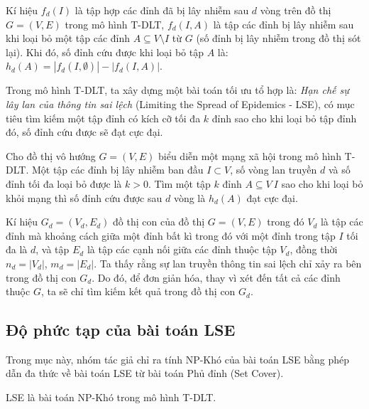 Kí hiệu $f_{d}(I)$ là tập hợp các đỉnh đã bị lây nhiễm sau $d$ vòng trên đồ thị $G = (V,E)$ trong mô hình T-DLT, $f_{d}(I,A)$ là tập các đỉnh bị lây nhiễm sau khi loại bỏ một tập các đỉnh $A \subseteq V \setminus I$ từ $G$ (số đỉnh bị lây nhiễm trong đồ thị sót lại). Khi đó, số đỉnh cứu được khi loại bỏ tập $A$ là: $h_{d}(A)=| f_{d}(I,\emptyset)|-|f_{d}(I,A)|$.

Trong mô hình T-DLT, ta xây dựng một bài toán tối ưu tổ hợp là: {\itshape Hạn chế sự lây lan của thông tin sai lệch} (Limiting the Spread of Epidemics - LSE), có mục tiêu tìm kiếm một tập đỉnh có kích cỡ tối đa $k$ đỉnh sao cho khi loại bỏ tập đỉnh đó, số đỉnh cứu được sẽ đạt cực đại.  

\begin{define}
	Cho đồ thị vô hướng $G=(V,E)$ biểu diễn một mạng xã hội trong mô hình T-DLT. Một tập các đỉnh bị lây nhiễm ban đầu $I \subset V$, số vòng lan truyền $d$ và số đỉnh tối đa loại bỏ được là $k > 0$. Tìm một tập $k$ đỉnh  $A \subseteq V \ I$ sao cho khi loại bỏ khỏi mạng thì số đỉnh cứu được sau $d$ vòng là $h_{d}(A)$ đạt cực đại.
\end{define}

Kí hiệu $G_{d} = (V_{d}, E_{d})$ đồ thị con của đồ thị $G=(V, E)$ trong đó $V_{d}$ là tập các đỉnh mà khoảng cách giữa một đỉnh bất kì trong đó với một đỉnh trong tập $I$ tối đa là $d$, và tập $E_{d}$ là tập các cạnh nối giữa các đỉnh thuộc tập $V_{d}$, đồng thời $n_{d} = | V_{d} |$, $m_{d} = | E_{d} |$. Ta thấy rằng sự lan truyền thông tin sai lệch chỉ xảy ra bên trong đồ thị con $G_{d}$. Do đó, để đơn giản hóa, thay vì xét đến tất cả các đỉnh thuộc $G$, ta sẽ chỉ tìm kiếm kết quả trong đồ thị con $G_{d}$.

\subsection{Độ phức tạp của bài toán LSE}
Trong mục này, nhóm tác giả chỉ ra tính NP-Khó của bài toán LSE bằng phép dẫn đa thức về bài toán LSE từ bài toán Phủ đỉnh (Set Cover). 

\begin{theo}
	LSE là bài toán NP-Khó trong mô hình T-DLT.
\end{theo}

